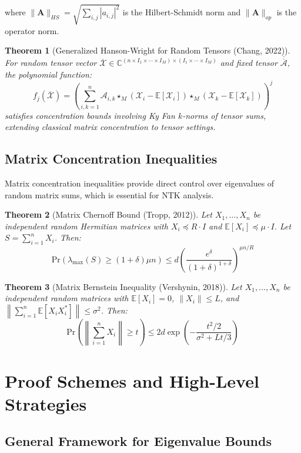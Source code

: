 \documentclass{article}
\newtheorem{theorem}{Theorem}[section]
\newcommand{\E}{\mathbb{E}}
\newcommand{\C}{\mathbb{C}}
\newcommand{\Pr}{\text{Pr}}
\begin{document}
where $\|\mathbf{A}\|_{HS} = \sqrt{\sum_{i,j} |a_{i,j}|^2}$ is the Hilbert-Schmidt norm and $\|\mathbf{A}\|_{op}$ is the operator norm.

\begin{theorem}[Generalized Hanson-Wright for Random Tensors (Chang, 2022)]
For random tensor vector $\overline{\mathcal{X}} \in \C^{(n \times I_1 \times \cdots \times I_M) \times (I_1 \times \cdots \times I_M)}$ and fixed tensor $\overline{\overline{\mathcal{A}}}$, the polynomial function:
$$f_j(\overline{\mathcal{X}}) = \left(\sum_{i,k=1}^n \mathcal{A}_{i,k} \star_M (\mathcal{X}_i - \E[\mathcal{X}_i]) \star_M (\mathcal{X}_k - \E[\mathcal{X}_k])\right)^j$$
satisfies concentration bounds involving Ky Fan $k$-norms of tensor sums, extending classical matrix concentration to tensor settings.
\end{theorem}

\subsection{Matrix Concentration Inequalities}

Matrix concentration inequalities provide direct control over eigenvalues of random matrix sums, which is essential for NTK analysis.

\begin{theorem}[Matrix Chernoff Bound (Tropp, 2012)]
Let $X_1, \ldots, X_n$ be independent random Hermitian matrices with $X_i \preceq R \cdot I$ and $\E[X_i] \preceq \mu \cdot I$. Let $S = \sum_{i=1}^n X_i$. Then:
$$\Pr(\lambda_{\max}(S) \geq (1+\delta)\mu n) \leq d \left(\frac{e^\delta}{(1+\delta)^{1+\delta}}\right)^{\mu n / R}$$
\end{theorem}

\begin{theorem}[Matrix Bernstein Inequality (Vershynin, 2018)]
Let $X_1, \ldots, X_n$ be independent random matrices with $\E[X_i] = 0$, $\|X_i\| \leq L$, and $\left\|\sum_{i=1}^n \E[X_i X_i^*]\right\| \leq \sigma^2$. Then:
$$\Pr\left(\left\|\sum_{i=1}^n X_i\right\| \geq t\right) \leq 2d \exp\left(-\frac{t^2/2}{\sigma^2 + Lt/3}\right)$$
\end{theorem}

\section{Proof Schemes and High-Level Strategies}

\subsection{General Framework for Eigenvalue Bounds}
\end{document}
